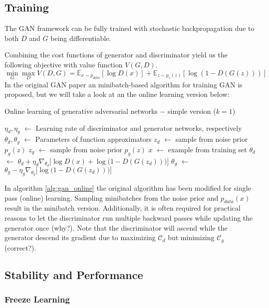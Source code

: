 \documentclass[twoside,11pt,a4paper]{article}
\newcommand*\Let[2]{\State #1 $\gets$ #2}
\theoremstyle{break}
\begin{document}
\subsection{Training}
\label{sub:gan_training}
The GAN framework can be fully trained with stochastic backpropagation due to both $D$ and $G$ being differentiable.

Combining the cost functions of generator and discriminator yield us the following objective with value function $V(G,D)$.
$$
\min_G \max_D V(D,G) = \mathbb{E}_{x \sim p_{data}}[\log D(x)] + \mathbb{E}_{z \sim p_z(z)}[\log(1 - D(G(z)))]
$$
In the original GAN paper an minibatch-based algorithm for training GAN is proposed, but we will take a look at an the online learning version below:\\
\begin{algorithm}
  \caption{Online learning of generative adversarial networks $-$ simple version ($k=1$)}
  \label{alg:gan_online}
  \begin{algorithmic}[1]
    \Let{$\eta_d, \eta_g$}{Learning rate of discriminator and generator networks, respectively}
    \Let{$\theta_d, \theta_g$}{Parameters of function approximators}
      \Let{$z_d$}{sample from noise prior $p_g(z)$}
      \Let{$z_g$}{sample from noise prior $p_g(z)$}
      \Let{$x$}{example from training set}
      \Let{$\theta_d$}{$\theta_d + \eta_d \nabla_{\theta_d} \bigg[\log D(x) + \log \big(1 - D(G(z_d))\big)\bigg]$}
      \Let{$\theta_g$}{$\theta_g - \eta_g \nabla_{\theta_g} \bigg[\log\big(1 - D(G(z_d))\big)\bigg]$}
    \EndFor
  \end{algorithmic}
\end{algorithm}

In algorithm \ref{alg:gan_online} the original algorithm has been modified for single pass (online) learning.
Sampling minibatches from the noise prior and $p_{data}(x)$ result in the minibatch version.
Additionally, it is often required for practical reasons to let the discriminator run multiple backward passes while updating the generator once (why?).
Note that the discriminator will ascend while the generator descend its gradient due to maximizing $\mathcal{C}_d$ but minimizing $\mathcal{C}_g$ (correct?).

\subsection{Stability and Performance}
\label{sub:gan_stability}

\subsubsection{Freeze Learning}
\label{ssub:gan_freeze_learning}
\end{document}
